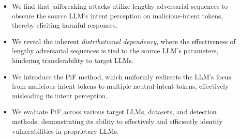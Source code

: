 \begin{itemize}[leftmargin=22pt,topsep=0pt, itemsep=2pt]
\item We find that jailbreaking attacks utilize lengthy adversarial sequences to obscure the source LLM's intent perception on malicious-intent tokens, thereby eliciting harmful responses.

\item We reveal the inherent \emph{distributional dependency}, where the effectiveness of lengthy adversarial sequences is tied to the source LLM's parameters, hindering transferability to target LLMs.

\item We introduce the PiF method, which uniformly redirects the LLM's focus from malicious-intent tokens to multiple neutral-intent tokens, effectively misleading its intent perception.

\item We evaluate PiF across various target LLMs, datasets, and detection methods, demonstrating its ability to effectively and efficiently identify vulnerabilities in proprietary LLMs.

\end{itemize}
